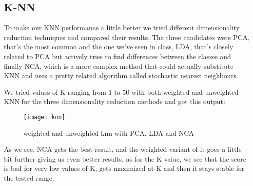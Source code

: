 
\subsection{K-NN}%
\label{sub:knn}
To make our KNN performance a little better we tried different dimensionality reduction techniques and compared their results.
The three candidates were PCA, that's the most common and the one we've seen in class, LDA, that's closely related to PCA but actively tries to find differences between the classes and finally NCA, which is a more complex method that could actually substitute KNN and uses a pretty related algorithm called stochastic nearest neighbours.

We tried values of K ranging from 1 to 50 with both weighted and unweighted KNN for the three dimensionality reduction methods and got this output:
\begin{figure}[H]
    \centering
    \texttt{[image: knn]}
    \caption{weighted and unweighted knn with PCA, LDA and NCA}%
    \label{fig:knn_pca_lda_nca}
\end{figure}

As we see, NCA gets the best result, and the weighted variant of it goes a little bit further giving us even better results, as for the K value, we see that the score is bad for very low values of K, gets maximized at K and then it stays stable for the tested range.
